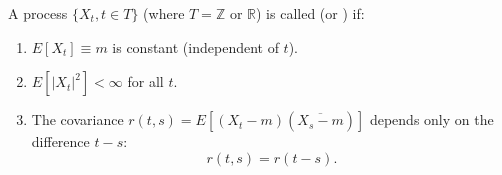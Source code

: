 A process $\{X_t, t \in T\}$ (where $T = \mathbb{Z}$ or $\mathbb{R}$) is called  (or ) if:
\begin{enumerate}
\item $E[X_t] \equiv m$ is constant (independent of $t$).
\item $E[|X_t|^2] < \infty$ for all $t$.
\item The covariance $r(t, s) = E[(X_t - m)(\overline{X_s - m})]$ depends only on the difference $t - s$:
  $$r(t, s) = r(t - s).$$
\end{enumerate}

